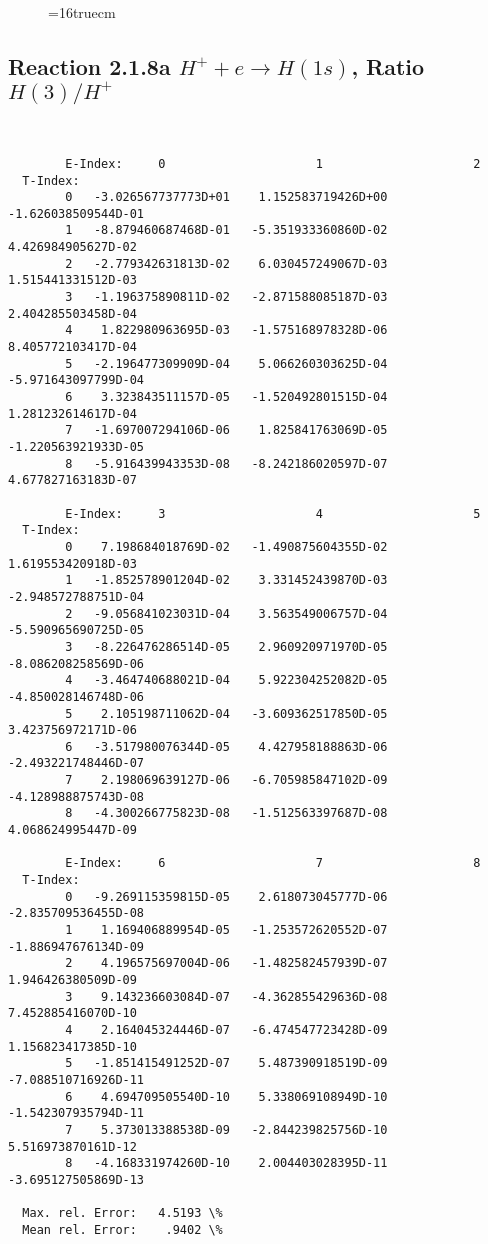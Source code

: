 \documentclass[12pt,dvipdfmx]{article}
\begin{document}
\begin{figure} \label{2.1.8_equil}
\epsfxsize=16truecm
\end{figure}
\newpage


\subsection{
Reaction 2.1.8a  $H^+ + e \rightarrow H(1s) $,  Ratio $H(3)/H^+$
}

\begin{small}\begin{verbatim}


        E-Index:     0                     1                     2
  T-Index:
        0   -3.026567737773D+01    1.152583719426D+00   -1.626038509544D-01
        1   -8.879460687468D-01   -5.351933360860D-02    4.426984905627D-02
        2   -2.779342631813D-02    6.030457249067D-03    1.515441331512D-03
        3   -1.196375890811D-02   -2.871588085187D-03    2.404285503458D-04
        4    1.822980963695D-03   -1.575168978328D-06    8.405772103417D-04
        5   -2.196477309909D-04    5.066260303625D-04   -5.971643097799D-04
        6    3.323843511157D-05   -1.520492801515D-04    1.281232614617D-04
        7   -1.697007294106D-06    1.825841763069D-05   -1.220563921933D-05
        8   -5.916439943353D-08   -8.242186020597D-07    4.677827163183D-07

        E-Index:     3                     4                     5
  T-Index:
        0    7.198684018769D-02   -1.490875604355D-02    1.619553420918D-03
        1   -1.852578901204D-02    3.331452439870D-03   -2.948572788751D-04
        2   -9.056841023031D-04    3.563549006757D-04   -5.590965690725D-05
        3   -8.226476286514D-05    2.960920971970D-05   -8.086208258569D-06
        4   -3.464740688021D-04    5.922304252082D-05   -4.850028146748D-06
        5    2.105198711062D-04   -3.609362517850D-05    3.423756972171D-06
        6   -3.517980076344D-05    4.427958188863D-06   -2.493221748446D-07
        7    2.198069639127D-06   -6.705985847102D-09   -4.128988875743D-08
        8   -4.300266775823D-08   -1.512563397687D-08    4.068624995447D-09

        E-Index:     6                     7                     8
  T-Index:
        0   -9.269115359815D-05    2.618073045777D-06   -2.835709536455D-08
        1    1.169406889954D-05   -1.253572620552D-07   -1.886947676134D-09
        2    4.196575697004D-06   -1.482582457939D-07    1.946426380509D-09
        3    9.143236603084D-07   -4.362855429636D-08    7.452885416070D-10
        4    2.164045324446D-07   -6.474547723428D-09    1.156823417385D-10
        5   -1.851415491252D-07    5.487390918519D-09   -7.088510716926D-11
        6    4.694709505540D-10    5.338069108949D-10   -1.542307935794D-11
        7    5.373013388538D-09   -2.844239825756D-10    5.516973870161D-12
        8   -4.168331974260D-10    2.004403028395D-11   -3.695127505869D-13

  Max. rel. Error:   4.5193 \%
  Mean rel. Error:    .9402 \%

\end{verbatim}\end{small}
\end{document}
